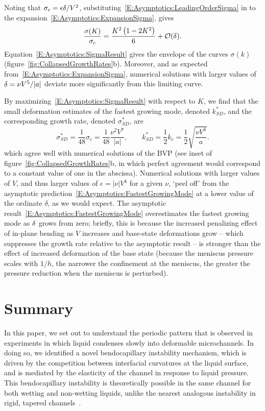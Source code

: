 \documentclass{jfm}
\newcommand{\aspect}{a} %
\begin{document}
Noting that $\sigma_c = \epsilon\delta/V^2$, substituting~\eqref{E:Asymptotics:LeadingOrderSigma} in to the expansion~\eqref{E:Asymptotics:ExpansionSigma}, gives
\begin{equation}\label{E:Asymptotics:SigmaResult}
\frac{\sigma(K)}{\sigma_c} =  \frac{K^2\left(1-2K^2 \right)}{6}  + \mathcal{O}(\delta).
\end{equation}
Equation~\eqref{E:Asymptotics:SigmaResult} gives the envelope of the curves $\sigma(k)$ (figure~\ref{fig:CollapsedGrowthRates}b). Moreover, and as expected from~\eqref{E:Asymptotics:ExpansionSigma}, numerical solutions with larger values of $\delta = \nu V^5 /|a|$ deviate more significantly from this limiting curve.

By maximizing~\eqref{E:Asymptotics:SigmaResult} with respect to $K$, we find that the small deformation estimates of the fastest growing mode, denoted $k^*_{SD}$, and the corresponding growth rate, denoted $\sigma^*_{SD}$, are
\begin{equation}\label{E:Asymptotics:FastestGrowingMode}
\sigma^*_{SD}= \frac{1}{48}\sigma_c = \frac{1}{48}\frac{\nu^2 V^7}{|\aspect|}, \qquad k^*_{SD}= \frac{1}{2}k_c = \frac{1}{2}\sqrt{\frac{\nu V^3}{\aspect}}.
\end{equation}
which agree well with numerical solutions of the BVP (see inset of figure~\ref{fig:CollapsedGrowthRates}b, in which perfect agreement would correspond to a constant value of one in the abscissa). Numerical solutions with larger values of $V$, and thus larger values of $\epsilon = |\nu| V^4$ for a given $\nu$, `peel off' from the asymptotic prediction~\eqref{E:Asymptotics:FastestGrowingMode} at a lower value of the ordinate $\delta$, as we would expect. The asymptotic result~\eqref{E:Asymptotics:FastestGrowingMode} overestimates the fastest growing mode as $\delta$ grows from zero; briefly, this is because the increased penalizing effect of in-plane bending as $V$ increases and base-state deformations grow -- which suppresses the growth rate relative to the asymptotic result -- is stronger than the effect of increased deformation of the base state (because the meniscus pressure scales with $1/h$, the narrower the confinement at the meniscus, the greater the pressure reduction when the meniscus is perturbed).

\section{Summary}\label{S:Conclusion}
In this paper, we set out to understand the periodic pattern that is observed in experiments in which liquid condenses slowly into deformable microchannels. In doing so, we identified a novel bendocapillary instability mechanism, which is driven by the competition between interfacial curvatures at the liquid surface, and is mediated by the elasticity of the channel in response to liquid pressure. This bendocapillary instability is theoretically possible in the same channel for both wetting and non-wetting liquids, unlike the nearest analogous instability in rigid, tapered channels~\citep{AlHousseiny2012NaturePhysics}.
\end{document}
